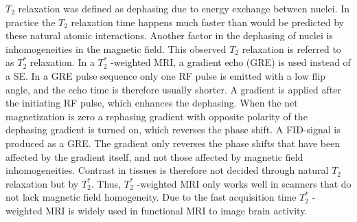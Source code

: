 $T_2$ relaxation was defined as dephasing due to energy exchange between nuclei. In practice the $T_2$ relaxation time happens much faster than would be predicted by these natural atomic interactions. Another factor in the dephasing of nuclei is inhomogeneities in the magnetic field. This observed $T_2$ relaxation is referred to as $T_{2}^*$ relaxation. In a $T_{2}^*$ -weighted MRI, a gradient echo (GRE) is used instead of a SE. In a GRE pulse sequence only one RF pulse is emitted with a low flip angle, and the echo time is therefore usually shorter. A gradient is applied after the initiating RF pulse, which enhances the dephasing. When the net magnetization is zero a rephasing gradient with opposite polarity of the dephasing gradient is turned on, which reverses the phase shift. A FID-signal is produced as a GRE. The gradient only reverses the phase shifts that have been affected by the gradient itself, and not those affected by magnetic field inhomogeneities. Contrast in tissues is therefore not decided through natural $T_2$ relaxation but by $T_{2}^*$. Thus, $T_{2}^*$ -weighted MRI only works well in scanners that do not lack magnetic field homogeneity. Due to the fast acquisition time $T_{2}^*$ -weighted MRI is widely used in functional MRI to image brain activity.  \cite{Chavhan2009}  

